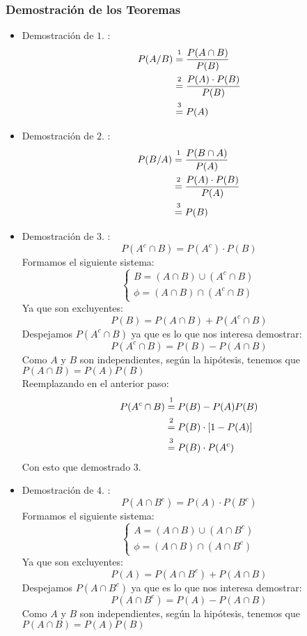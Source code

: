 \subsubsection{Demostración de los Teoremas}
\begin{itemize}
\item Demostración de $1.$ :
\begin{align*}
P(A/B) &\varstackrel{1}{=} \dfrac{P(A\cap B)}{P(B)} \\
&\varstackrel{2}{=} \dfrac{P(A)\cdot P(B)}{P(B)} \\
&\varstackrel{3}{=} P(A)
\end{align*}
\item Demostración de $2.$ :
\begin{align*}
P(B/A) &\varstackrel{1}{=} \dfrac{P(B\cap A)}{P(A)} \\
&\varstackrel{2}{=} \dfrac{P(A)\cdot P(B)}{P(A)}  \\
&\varstackrel{3}{=} P(B)
\end{align*}
\item Demostración de $3.$ :
$$P(A^c \cap B) = P(A^c)\cdot P(B)$$
Formamos el siguiente sistema:
$$
\begin{cases} 
B = (A\cap B) \cup (A^c \cap B)\\
\phi = (A\cap B) \cap (A^c \cap B)
\end{cases}
$$
Ya que son excluyentes:
$$P(B)=P(A\cap B)+P(A^c \cap B)$$
Despejamos $P(A^c \cap B)$ ya que es lo que nos interesa demostrar:
$$P(A^c \cap B)=P(B)-P(A\cap B)$$
Como $A$ y $B$ son independientes, según la hipótesis, tenemos que $P(A\cap B)=P(A)P(B)$\\
Reemplazando en el anterior paso:
\begin{align*}
P(A^c \cap B) &\varstackrel{1}{=} P(B)-P(A)P(B) \\
&\varstackrel{2}{=} P(B)\cdot [1-P(A)]  \\
&\varstackrel{3}{=} P(B)\cdot P(A^c)
\end{align*}
Con esto que demostrado $3$.
\item Demostración de $4.$ :
$$P(A \cap B^c) = P(A)\cdot P(B^c)$$
Formamos el siguiente sistema:
$$
\begin{cases} 
A = (A\cap B) \cup (A \cap B^c)\\
\phi = (A\cap B) \cap (A\cap B^c)
\end{cases}
$$
Ya que son excluyentes:
$$P(A)=P(A\cap B^c)+P(A \cap B)$$
Despejamos $P(A \cap B^c)$ ya que es lo que nos interesa demostrar:
$$P(A \cap B^c)=P(A)-P(A\cap B)$$
Como $A$ y $B$ son independientes, según la hipótesis, tenemos que $P(A\cap B)=P(A)P(B)$\\

\end{itemize}
